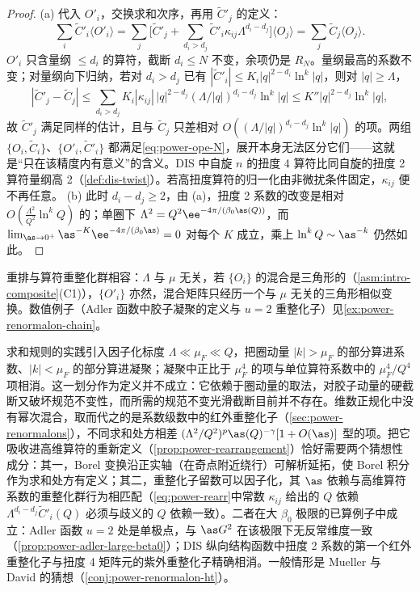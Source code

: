 \begin{proof}
(a) 代入 $O'_i$，交换求和次序，再用 $\tilde C'_j$ 的定义：
\begin{equation*}
\sum_i\tilde C'_i\langle O'_i\rangle=\sum_j\Big[\tilde C'_j+\sum_{d_i>d_j}\tilde C'_i\kappa_{ij}\Lambda^{d_i-d_j}\Big]\langle O_j\rangle=\sum_j\tilde C_j\langle O_j\rangle .
\end{equation*}
$O'_i$ 只含量纲 $\le d_i$ 的算符，截断 $d_i\le N$ 不变，余项仍是 $R_N$。量纲最高的系数不变；对量纲向下归纳，若对 $d_i>d_j$ 已有 $|\tilde C'_i|\le K_i|q|^{2-d_i}\ln^k|q|$，则对 $|q|\ge\Lambda$，
\begin{equation*}
|\tilde C'_j-\tilde C_j|\le\sum_{d_i>d_j}K_i|\kappa_{ij}|\,|q|^{2-d_j}(\Lambda/|q|)^{d_i-d_j}\ln^k|q|\le K''|q|^{2-d_j}\ln^k|q| ,
\end{equation*}
故 $\tilde C'_j$ 满足同样的估计，且与 $\tilde C_j$ 只差相对 $O((\Lambda/|q|)^{d_i-d_j}\ln^k|q|)$ 的项。两组 $\{O_i,\tilde C_i\}$、$\{O'_i,\tilde C'_i\}$ 都满足\eqref{eq:power-ope-N}，展开本身无法区分它们——这就是“只在该精度内有意义”的含义。DIS 中自旋 $n$ 的扭度 4 算符比同自旋的扭度 2 算符量纲高 2（\cref{def:dis-twist}）。若高扭度算符的归一化由非微扰条件固定，$\kappa_{ij}$ 便不再任意。
(b) 此时 $d_i-d_j\ge2$，由 (a)，扭度 2 系数的改变是相对 $O(\frac{\Lambda^2}{Q^2}\ln^kQ)$ 的；单圈下 $\Lambda^2=Q^2\ee^{-4\pi/(\beta_0\as(Q))}$，而 $\lim_{\as\to0^+}\as^{-K}\ee^{-4\pi/(\beta_0\as)}=0$ 对每个 $K$ 成立，乘上 $\ln^kQ\sim\as^{-k}$ 仍然如此。
\end{proof}

重排与算符重整化群相容：$\Lambda$ 与 $\mu$ 无关，若 $\{O_i\}$ 的混合是三角形的（\cref{asm:intro-composite}(C1)），$\{O'_i\}$ 亦然，混合矩阵只经历一个与 $\mu$ 无关的三角形相似变换。数值例子（Adler 函数中胶子凝聚的定义与 $u=2$ 重整化子）见\cref{ex:power-renormalon-chain}。

\begin{remark}\label{rem:power-practical-ope}
求和规则的实践\cite{ShifmanVainshteinZakharov1979a}引入因子化标度 $\Lambda\ll\mu_F\ll Q$，把圈动量 $|k|>\mu_F$ 的部分算进系数、$|k|<\mu_F$ 的部分算进凝聚；凝聚中正比于 $\mu_F^4$ 的项与单位算符系数中的 $\mu_F^4/Q^4$ 项相消\cite[第~2.3~节]{Beneke1999}。这一划分作为定义并不成立：它依赖于圈动量的取法，对胶子动量的硬截断又破坏规范不变性，而所需的规范不变光滑截断目前并不存在。维数正规化中没有幂次混合，取而代之的是系数级数中的红外重整化子（\cref{sec:power-renormalons}），不同求和处方相差 $(\Lambda^2/Q^2)^p\as(Q)^{-\gamma}[1+O(\as)]$ 型的项。把它吸收进高维算符的重新定义（\cref{prop:power-rearrangement}）恰好需要两个猜想性成分：其一，Borel 变换沿正实轴（在奇点附近绕行）可解析延拓，使 Borel 积分作为求和处方有定义；其二，重整化子留数可以因子化，其 $\as$ 依赖与高维算符系数的重整化群行为相匹配（\eqref{eq:power-rearr}中常数 $\kappa_{ij}$ 给出的 $Q$ 依赖 $\Lambda^{d_i-d_j}\tilde C'_i(Q)$ 必须与歧义的 $Q$ 依赖一致）。二者在大 $\beta_0$ 极限的已算例子中成立：Adler 函数 $u=2$ 处是单极点，与 $\as G^2$ 在该极限下无反常维度一致（\cref{prop:power-adler-large-beta0}）；DIS 纵向结构函数中扭度 2 系数的第一个红外重整化子与扭度 4 矩阵元的紫外重整化子精确相消\cite[第~4.2.2~节]{Beneke1999}。一般情形是 Mueller 与 David 的猜想（\cref{conj:power-renormalon-ht}）。
\end{remark}

